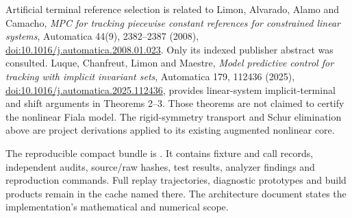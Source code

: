 \documentclass[11pt]{article}
\begin{document}
Artificial terminal reference selection is related to Limon, Alvarado, Alamo
and Camacho, \emph{MPC for tracking piecewise constant references for constrained
linear systems}, Automatica 44(9), 2382--2387 (2008),
\href{https://doi.org/10.1016/j.automatica.2008.01.023}{doi:10.1016/j.automatica.2008.01.023}.
Only its indexed publisher abstract was consulted. Luque, Chanfreut, Limon and
Maestre, \emph{Model predictive control for tracking with implicit invariant
sets}, Automatica 179, 112436 (2025),
\href{https://doi.org/10.1016/j.automatica.2025.112436}{doi:10.1016/j.automatica.2025.112436},
provides linear-system implicit-terminal and shift arguments in Theorems 2--3.
Those theorems are not claimed to certify the nonlinear Fiala model. The
rigid-symmetry transport and Schur elimination above are project derivations
applied to its existing augmented nonlinear core.

The reproducible compact bundle is
. It contains fixture and call records,
independent audits, source/raw hashes, test results, analyzer findings and
reproduction commands. Full replay trajectories, diagnostic prototypes and
build products remain in the cache named there. The architecture document
states the implementation's mathematical and numerical scope.
\end{document}
